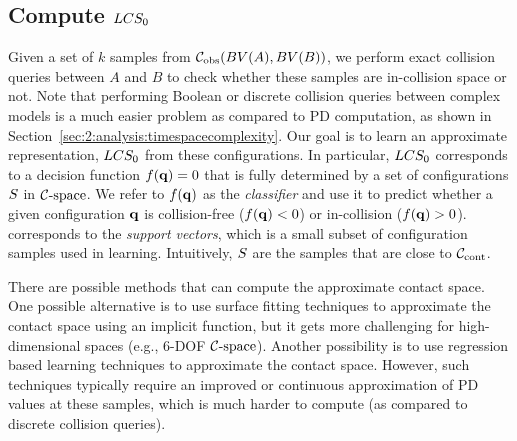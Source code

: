 \subsection{Compute $LCS_0$} \label{sec:2:offline:model}
Given a set of $k$ samples from
$\mathcal C_{\text{obs}}(BV(A),BV(B))$, we perform exact collision queries between $A$ and $B$  to
check whether these samples are in-collision space or not. Note that performing Boolean or discrete collision queries between complex models is a much easier problem as compared to PD computation, as shown in Section~\ref{sec:2:analysis:timespacecomplexity}.
Our goal is to learn an approximate representation, $LCS_0$ from these
configurations. In particular, $LCS_0$ corresponds to a decision function
$f(\mathbf q)=0$ that is fully determined by a set of configurations $S$
in $\mathcal C\text{-space}$. We refer to $f(\mathbf q)$ as the \emph{classifier} and use it to
predict whether a given configuration $\mathbf q$ is collision-free
($f(\mathbf q)<0$) or in-collision ($f(\mathbf q)>0$). \SV corresponds to the \emph{support vectors}, which is a
small subset of configuration samples used in learning.
Intuitively, $S$ are the samples that are close to $\mathcal C_\text{cont}$.

There are possible methods that can compute the approximate contact space.
One possible alternative is to use surface fitting techniques to approximate the contact space using an implicit function, but it gets more challenging for high-dimensional spaces (e.g., 6-DOF $\mathcal C\text{-space}$). Another possibility is to use regression based learning techniques to approximate the contact space. However, such techniques typically require an improved or continuous approximation of PD values at these samples, which is much harder to compute (as compared to discrete collision queries).

